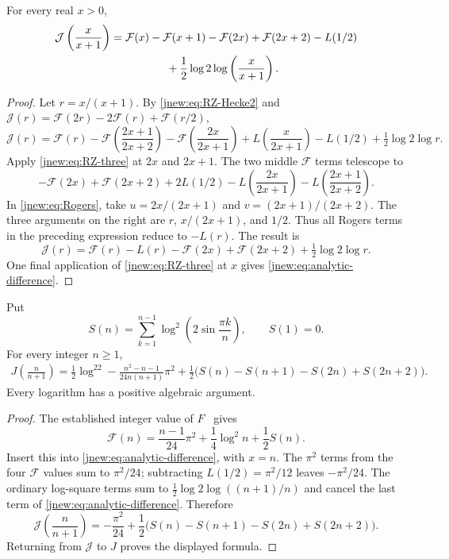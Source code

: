 \begin{lemma}
\label{jnew:lem:analytic-difference}
For every real $x>0$,
\begin{align}
 \mathcal J\left(\frac{x}{x+1}\right)
 ={}&\mathcal F(x)-\mathcal F(x+1)-\mathcal F(2x)
       +\mathcal F(2x+2)-L(1/2)\nonumber\\
 &\hspace{13mm}+\frac12\log2\log\left(\frac{x}{x+1}\right).
 \label{jnew:eq:analytic-difference}
\end{align}
\end{lemma}
\begin{proof}
Let $r=x/(x+1)$. By \eqref{jnew:eq:RZ-Hecke2} and
$\mathcal J(r)=\mathcal F(2r)-2\mathcal F(r)+\mathcal F(r/2)$,
\[
 \mathcal J(r)=\mathcal F(r)
 -\mathcal F\left(\frac{2x+1}{2x+2}\right)
 -\mathcal F\left(\frac{2x}{2x+1}\right)
 +L\left(\frac{x}{2x+1}\right)-L(1/2)
 +\tfrac12\log2\log r.
\]
Apply \eqref{jnew:eq:RZ-three} at $2x$ and $2x+1$. The two
middle $\mathcal F$ terms telescope to
\[
 -\mathcal F(2x)+\mathcal F(2x+2)+2L(1/2)
 -L\left(\frac{2x}{2x+1}\right)
 -L\left(\frac{2x+1}{2x+2}\right).
\]
In \eqref{jnew:eq:Rogers}, take
$u=2x/(2x+1)$ and $v=(2x+1)/(2x+2)$.
The three arguments on the right are $r$, $x/(2x+1)$, and $1/2$.
Thus all Rogers terms in the preceding expression reduce to $-L(r)$.
The result is
\[
 \mathcal J(r)=\mathcal F(r)-L(r)-\mathcal F(2x)
                       +\mathcal F(2x+2)+\tfrac12\log2\log r.
\]
One final application of \eqref{jnew:eq:RZ-three} at $x$ gives
\eqref{jnew:eq:analytic-difference}.
\end{proof}

\begin{theorem}
\label{jnew:thm:consecutive-analytic}
Put
\[
 S(n)=\sum_{k=1}^{n-1}\log^2\left(2\sin\frac{\pi k}{n}\right),
 \qquad S(1)=0.
\]
For every integer $n\ge1$,
\begin{align}
 \boxed{\displaystyle
 J\left(\frac{n}{n+1}\right)
 =\frac12\log^22
  -\frac{n^2-n-1}{24n(n+1)}\pi^2
  +\frac12\bigl(S(n)-S(n+1)-S(2n)+S(2n+2)\bigr).}
 \label{jnew:eq:consecutive-analytic}
\end{align}
Every logarithm has a positive algebraic argument.
\end{theorem}
\begin{proof}
The established integer value of $F$~\cite[eq.~(23)]{RadchenkoZagier} gives
\begin{equation}\label{jnew:eq:F-normalized-integer}
 \mathcal F(n)=\frac{n-1}{24}\pi^2
              +\frac14\log^2n+\frac12S(n).
\end{equation}
Insert this into \eqref{jnew:eq:analytic-difference}, with $x=n$.
The $\pi^2$ terms from the four $\mathcal F$ values sum to
$\pi^2/24$; subtracting $L(1/2)=\pi^2/12$ leaves $-\pi^2/24$.
The ordinary log-square terms sum to
$\tfrac12\log2\log((n+1)/n)$ and cancel the last term of
\eqref{jnew:eq:analytic-difference}. Therefore
\[
 \mathcal J\left(\frac n{n+1}\right)
 =-\frac{\pi^2}{24}
   +\frac12\bigl(S(n)-S(n+1)-S(2n)+S(2n+2)\bigr).
\]
Returning from $\mathcal J$ to $J$ proves the displayed formula.
\end{proof}

